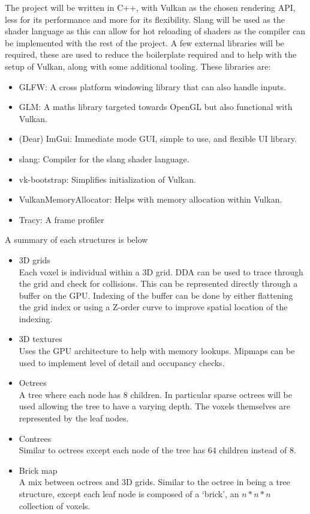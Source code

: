 The project will be written in C++, with Vulkan as the chosen rendering API,
less for its performance and more for its flexibility.
Slang will be used as the shader language as this can allow for hot reloading
of shaders as the compiler can be implemented with the rest of the project.
A few external libraries will be required, these are used to reduce the
boilerplate required and to help with the setup of Vulkan, along with
some additional tooling. These libraries are:
\begin{itemize}
  \item GLFW: A cross platform windowing library that can also handle inputs.
  \item GLM: A maths library targeted towards OpenGL but also
    functional with Vulkan.
  \item (Dear) ImGui: Immediate mode GUI, simple to use, and flexible
    UI library.
  \item slang: Compiler for the slang shader language.
  \item vk-bootstrap: Simplifies initialization of Vulkan.
  \item VulkanMemoryAllocator: Helps with memory allocation within Vulkan.
  \item Tracy: A frame profiler
\end{itemize}

A summary of each structures is below
\begin{itemize}
  \item 3D grids \\
    Each voxel is individual within a 3D grid. DDA can be used to
    trace through the grid and check for collisions. This can be
    represented directly through a buffer on the GPU. Indexing of the buffer
    can be done by either flattening the grid index or using a Z-order curve
    to improve spatial location of the indexing.
  \item 3D textures \\
    Uses the GPU architecture to help with memory lookups. Mipmaps
    can be used to implement level of detail and occupancy checks.
  \item Octrees \\
    A tree where each node has 8 children. In particular sparse octrees will be
    used allowing the tree to have a varying depth. The voxels themselves are
    represented by the leaf nodes.
  \item Contrees \\
    Similar to octrees except each node of the tree has $64$ children
    instead of $8$.
  \item Brick map \\
    A mix between octrees and 3D grids. Similar to the octree in
    being a tree structure, except each leaf node is composed of a `brick', an
    $n*n*n$ collection of voxels.
\end{itemize}

